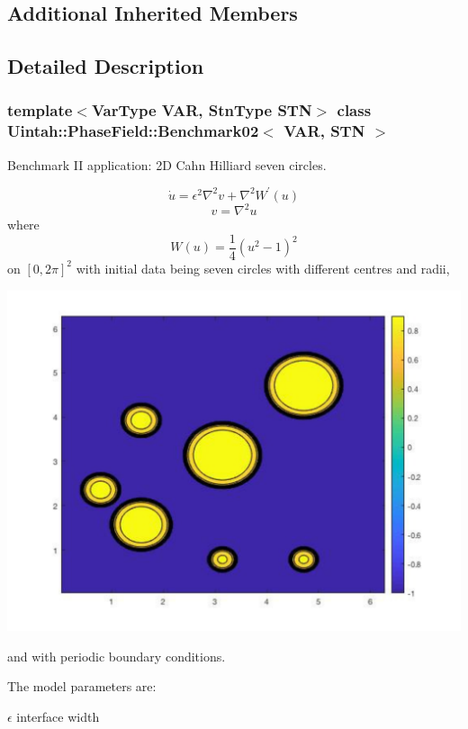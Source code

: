 \subsection*{Additional Inherited Members}


\subsection{Detailed Description}
\subsubsection*{template$<$Var\+Type V\+AR, Stn\+Type S\+TN$>$\newline
class Uintah\+::\+Phase\+Field\+::\+Benchmark02$<$ V\+A\+R, S\+T\+N $>$}

Benchmark II application\+: 2D Cahn Hilliard seven circles. 

\[ \dot u = \epsilon^2 \nabla^2 v + \nabla^2 W^\prime(u) \] \[ v = \nabla^2 u \] where \[ W (u) = \frac{1}{4} (u^2 − 1)^2 \] on $[0, 2\pi]^2$ with initial data being seven circles with different centres and radii,


\begin{DoxyImage}
\includegraphics[width=\textwidth,height=\textheight/2,keepaspectratio=true]{benchmark02_ic}
\end{DoxyImage}
 and with periodic boundary conditions.

The model parameters are\+:
\begin{DoxyItemize}
\item $ \epsilon $ interface width
\end{DoxyItemize}


